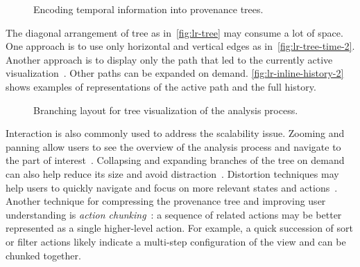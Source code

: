 \begin{figure}[!htb]
\centering
{} 
\hfill
{}
\caption{Encoding temporal information into provenance trees.}
\end{figure}

The diagonal arrangement of tree as in~\autoref{fig:lr-tree} may consume a lot of space. One approach is to use only horizontal and vertical edges as in~\autoref{fig:lr-tree-time-2}. Another approach is to display only the path that led to the currently active  visualization~\cite{Klemmer2002}. Other paths can be expanded on demand. \autoref{fig:lr-inline-history-2} shows examples of representations of the active path and the full history.

\begin{figure}[!htb]
\centering
{}
\hfill
{}
\caption{Branching layout for tree visualization of the analysis process. }
\end{figure}

Interaction is also commonly used to address the scalability issue. Zooming and panning allow users to see the overview of the analysis process and navigate to the part of interest~\cite{Dunne2012}. Collapsing and expanding branches of the tree on demand can also help reduce its size and avoid distraction~\cite{Bavoil2005}. Distortion techniques may help users to quickly navigate and focus on more relevant states and actions~\cite{Meng1998}. Another technique for compressing the provenance tree and improving user understanding is \emph{action chunking}~\cite{Heer2008}: a sequence of related actions may be better represented as a single higher-level action. For example, a quick succession of sort or filter actions likely indicate a multi-step configuration of the view and can be chunked together.

